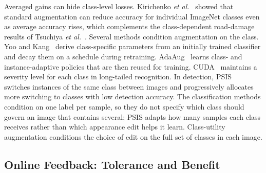\documentclass[conference]{IEEEtran}
\begin{document}
Averaged gains can hide class-level losses. Kirichenko \emph{et al.}~\cite{kirichenko2023} showed that standard augmentation can reduce accuracy for individual ImageNet classes even as average accuracy rises, which complements the class-dependent road-damage results of Tsuchiya \emph{et al.}~\cite{tsuchiya2019}. Several methods condition augmentation on the class. Yoo and Kang~\cite{yoo2023} derive class-specific parameters from an initially trained classifier and decay them on a schedule during retraining. AdaAug~\cite{cheung2022adaaug} learns class- and instance-adaptive policies that are then reused for training. CUDA~\cite{ahn2023cuda} maintains a severity level for each class in long-tailed recognition. In detection, PSIS~\cite{wang2019psis} switches instances of the same class between images and progressively allocates more switching to classes with low detection accuracy. The classification methods condition on one label per sample, so they do not specify which class should govern an image that contains several; PSIS adapts how many samples each class receives rather than which appearance edit helps it learn. Class-utility augmentation conditions the choice of edit on the full set of classes in each image.

\subsection{Online Feedback: Tolerance and Benefit}
\end{document}
